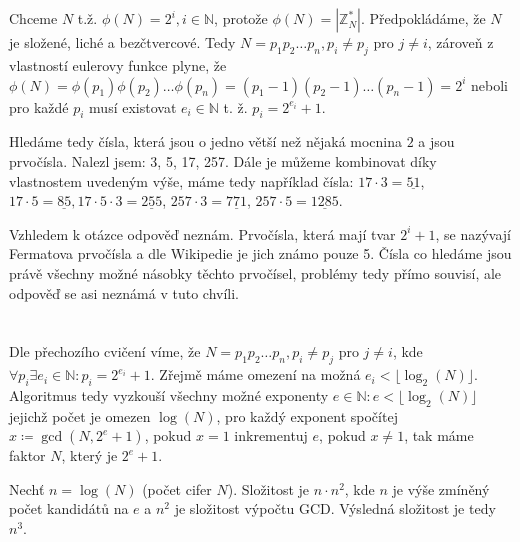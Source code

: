 \documentclass[12pt, a4paper]{article}
\begin{document}
\section{}
Chceme $N$ t.ž. $\phi(N)=2^i, i \in \mathbb{N}$, protože $\phi(N)=|\mathbb{Z}^*_N|$. Předpokládáme, že $N$ je složené, liché a bezčtvercové. Tedy $N = p_1p_2\dots p_n, p_i\neq p_j$ pro $j\neq i$, zároveň z vlastností eulerovy funkce plyne, že $\phi(N)=\phi(p_1)\phi(p_2)\dots \phi(p_n) = (p_1-1)(p_2-1)\dots (p_n-1)=2^i$ neboli pro každé $p_i$ musí existovat $e_i \in \mathbb{N}$ t. ž. $p_i = 2^{e_i} + 1$. 

Hledáme tedy čísla, která jsou o jedno větší než nějaká mocnina $2$ a jsou prvočísla. Nalezl jsem: 3, 5, 17, 257. Dále je můžeme kombinovat díky vlastnostem uvedeným výše, máme tedy například čísla: $17\cdot 3 = \underline{51}$, $17 \cdot 5 = \underline{85}, 17 \cdot 5 \cdot 3 = \underline{255}$, $257\cdot 3 = \underline{771}$, $257 \cdot 5 = \underline{1285}$.

Vzhledem k otázce  odpověď neznám. Prvočísla, která mají tvar $2^i + 1$, se nazývají Fermatova prvočísla a dle Wikipedie je jich známo pouze 5. Čísla co hledáme jsou právě všechny možné násobky těchto prvočísel, problémy tedy přímo souvisí, ale odpověď se asi neznámá v tuto chvíli.

\section{}
Dle přechozího cvičení víme, že $N = p_1p_2\dots p_n, p_i\neq p_j$ pro $j\neq i$, kde $\forall p_i \exists e_i \in \mathbb{N}: p_i = 2^{e_i}+1$. Zřejmě máme omezení na možná $e_i < \lfloor \log_2(N) \rfloor$. Algoritmus tedy vyzkouší všechny možné exponenty $e \in \mathbb{N}: e < \lfloor \log_2(N) \rfloor$  jejichž počet je omezen $\log(N)$, pro každý exponent spočítej $x \coloneqq \gcd(N,2^e+1)$, pokud $x=1$ inkrementuj $e$, pokud $x \neq 1$, tak máme faktor $N$, který je $2^e+1$.

Nechť $n = \log(N)$ (počet cifer $N$). Složitost je $n \cdot n^2$, kde $n$ je výše zmíněný počet kandidátů na $e$ a $n^2$ je složitost výpočtu GCD. Výsledná složitost je tedy $n^3$.
\end{document}
